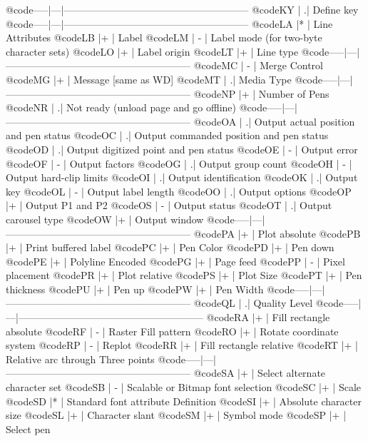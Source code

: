 @code{-----|---|--------------------------------------------------------}
@code{KY   |  .| Define key}
@code{-----|---|--------------------------------------------------------}
@code{LA   |*  | Line Attributes}
@code{LB   |+  | Label}
@code{LM   | - | Label mode (for two-byte character sets)}
@code{LO   |+  | Label origin}
@code{LT   |+  | Line type}
@code{-----|---|--------------------------------------------------------}
@code{MC   | - | Merge Control}
@code{MG   |+  | Message [same as WD]}
@code{MT   |  .| Media Type}
@code{-----|---|--------------------------------------------------------}
@code{NP   |+  | Number of Pens}
@code{NR   |  .| Not ready (unload page and go offline)}
@code{-----|---|--------------------------------------------------------}
@code{OA   |  .| Output actual position and pen status}
@code{OC   |  .| Output commanded position and pen status}
@code{OD   |  .| Output digitized point and pen status}
@code{OE   | - | Output error}
@code{OF   | - | Output factors}
@code{OG   |  .| Output group count}
@code{OH   | - | Output hard-clip limits}
@code{OI   |  .| Output identification}
@code{OK   |  .| Output key}
@code{OL   | - | Output label length}
@code{OO   |  .| Output options}
@code{OP   |+  | Output P1 and P2}
@code{OS   | - | Output status}
@code{OT   |  .| Output carousel type}
@code{OW   |+  | Output window}
@code{-----|---|--------------------------------------------------------}
@code{PA   |+  | Plot absolute}
@code{PB   |+  | Print buffered label}
@code{PC   |+  | Pen Color}
@code{PD   |+  | Pen down}
@code{PE   |+  | Polyline Encoded}
@code{PG   |+  | Page feed}
@code{PP   | - | Pixel placement}
@code{PR   |+  | Plot relative}
@code{PS   |+  | Plot Size}
@code{PT   |+  | Pen thickness}
@code{PU   |+  | Pen up}
@code{PW   |+  | Pen Width}
@code{-----|---|--------------------------------------------------------}
@code{QL   |  .| Quality Level} 
@code{-----|---|--------------------------------------------------------}
@code{RA   |+  | Fill rectangle absolute}
@code{RF   | - | Raster Fill pattern}
@code{RO   |+  | Rotate coordinate system}
@code{RP   | - | Replot}
@code{RR   |+  | Fill rectangle relative}
@code{RT   |+  | Relative arc through Three points}
@code{-----|---|--------------------------------------------------------}
@code{SA   |+  | Select alternate character set}
@code{SB   | - | Scalable or Bitmap font selection}
@code{SC   |+  | Scale}
@code{SD   |*  | Standard font attribute Definition}
@code{SI   |+  | Absolute character size}
@code{SL   |+  | Character slant}
@code{SM   |+  | Symbol mode}
@code{SP   |+  | Select pen}
